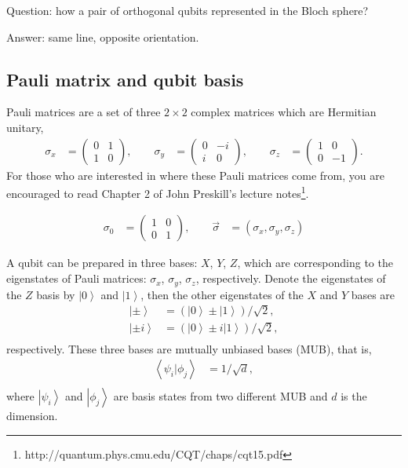 \documentclass[onecolumn,pra,superscriptaddress,nofootinbib]{revtex4-1}
\newcommand{\ket}[1]{\mbox{$\left| #1 \right\rangle$}}
\newcommand{\braket}[2]{\mbox{$\left\langle #1 | #2 \right\rangle$}}
\begin{document}
Question: how a pair of orthogonal qubits represented in the Bloch sphere?

Answer: same line, opposite orientation.

\subsection{Pauli matrix and qubit basis}
Pauli matrices are a set of three $2\times2$ complex matrices which are Hermitian unitary,
\begin{equation} \label{eq:PauliMatrix}
\begin{aligned}
\sigma_x &=
    \begin{pmatrix}
      0&1\\
      1&0
    \end{pmatrix}, \quad\quad
\sigma_y &=
    \begin{pmatrix}
      0&-i\\
      i&0
    \end{pmatrix}, \quad\quad
\sigma_z &=
    \begin{pmatrix}
      1&0\\
      0&-1
    \end{pmatrix}.
\end{aligned}
\end{equation}
For those who are interested in where these Pauli matrices come from, you are encouraged to read Chapter 2 of John Preskill's lecture notes\footnote{http://quantum.phys.cmu.edu/CQT/chaps/cqt15.pdf}.

\begin{equation} \label{eq:IPauliVector}
\begin{aligned}
\sigma_0 &=
    \begin{pmatrix}
      1&0\\
      0&1
    \end{pmatrix}, \quad\quad
\vec{\sigma} &= (\sigma_x,\sigma_y,\sigma_z)
\end{aligned}
\end{equation}


A qubit can be prepared in three bases: $X$, $Y$, $Z$, which are corresponding to the eigenstates of Pauli matrices: $\sigma_x$, $\sigma_y$, $\sigma_z$, respectively. Denote the eigenstates of the $Z$ basis by $\ket{0}$ and $\ket{1}$, then the other eigenstates of the $X$ and $Y$ bases are
\begin{equation} \label{eq:XYZbasis}
\begin{aligned}
\ket{\pm} &= (\ket{0}\pm\ket{1})/\sqrt2, \\
\ket{\pm i} &= (\ket{0}\pm i\ket{1})/\sqrt2, \\
\end{aligned}
\end{equation}
respectively. These three bases are mutually unbiased bases (MUB), that is,
\begin{equation} \label{eq:MUB}
\begin{aligned}
\braket{\psi_i}{\phi_j} &= 1/\sqrt d, \\
\end{aligned}
\end{equation}
where $\ket{\psi_i}$ and $\ket{\phi_j}$ are basis states from two different MUB and $d$ is the dimension.
\end{document}
